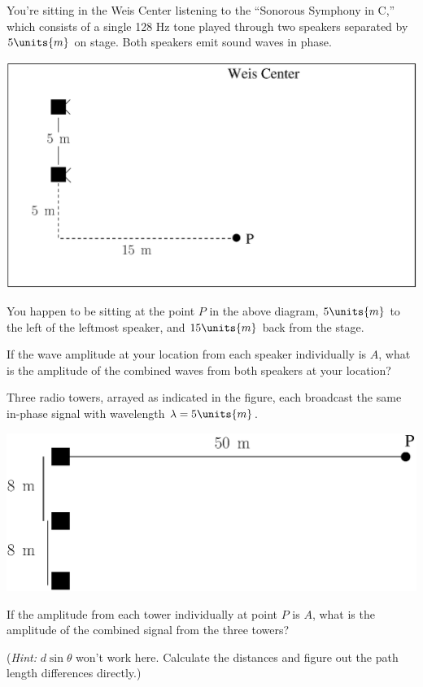 \begin{problem}
You're sitting in the Weis Center listening to the 
``Sonorous Symphony in C,'' which consists of
a single 128 Hz tone played through two speakers separated by
$5\units{m}$ on stage. Both speakers emit sound waves in phase.

 \includegraphics[width=4.0truein]{phasors/phasor14} 

\noindent You happen to be sitting at the point $P$ in the above
diagram, $5\units{m}$ to the left of the leftmost speaker, and
$15\units{m}$ back from the stage.

If the wave amplitude at your location from each speaker individually
is $A$, what is the amplitude of the combined waves from both speakers
at your location?
\end{problem}

\newpage

\begin{problem}
Three radio towers, arrayed as indicated in the figure, each broadcast
the same in-phase signal with wavelength $\lambda = 5\units{m}$.

 \includegraphics[width=2.4truein]{phasors/phasor25} 

\noindent If the amplitude from each tower individually at point $P$
is $A$, what is the amplitude of the combined signal from the three
towers?

\noindent ({\em Hint:} $d\sin{\theta}$ won't work here. Calculate 
the distances and figure out the path length differences directly.)
\label{prob:three_towers}
\end{problem}

